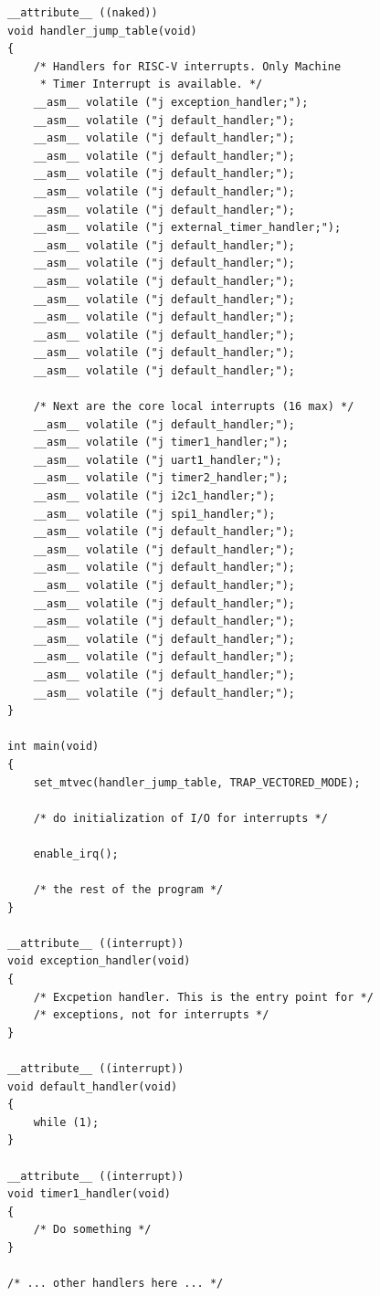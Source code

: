 \documentclass[12pt]{article}
\begin{document}
\begin{lstlisting}[]
__attribute__ ((naked))
void handler_jump_table(void)
{
	/* Handlers for RISC-V interrupts. Only Machine
	 * Timer Interrupt is available. */
	__asm__ volatile ("j exception_handler;");
	__asm__ volatile ("j default_handler;");
	__asm__ volatile ("j default_handler;");
	__asm__ volatile ("j default_handler;");
	__asm__ volatile ("j default_handler;");
	__asm__ volatile ("j default_handler;");
	__asm__ volatile ("j default_handler;");
	__asm__ volatile ("j external_timer_handler;");
	__asm__ volatile ("j default_handler;");
	__asm__ volatile ("j default_handler;");
	__asm__ volatile ("j default_handler;");
	__asm__ volatile ("j default_handler;");
	__asm__ volatile ("j default_handler;");
	__asm__ volatile ("j default_handler;");
	__asm__ volatile ("j default_handler;");
	__asm__ volatile ("j default_handler;");

	/* Next are the core local interrupts (16 max) */
	__asm__ volatile ("j default_handler;");
	__asm__ volatile ("j timer1_handler;");
	__asm__ volatile ("j uart1_handler;");
	__asm__ volatile ("j timer2_handler;");
	__asm__ volatile ("j i2c1_handler;");
	__asm__ volatile ("j spi1_handler;");
	__asm__ volatile ("j default_handler;");
	__asm__ volatile ("j default_handler;");
	__asm__ volatile ("j default_handler;");
	__asm__ volatile ("j default_handler;");
	__asm__ volatile ("j default_handler;");
	__asm__ volatile ("j default_handler;");
	__asm__ volatile ("j default_handler;");
	__asm__ volatile ("j default_handler;");
	__asm__ volatile ("j default_handler;");
	__asm__ volatile ("j default_handler;");
}

int main(void)
{
    set_mtvec(handler_jump_table, TRAP_VECTORED_MODE);

    /* do initialization of I/O for interrupts */

    enable_irq();

    /* the rest of the program */
}

__attribute__ ((interrupt))
void exception_handler(void)
{
    /* Excpetion handler. This is the entry point for */
    /* exceptions, not for interrupts */
}

__attribute__ ((interrupt))
void default_handler(void)
{
    while (1);
}

__attribute__ ((interrupt))
void timer1_handler(void)
{
    /* Do something */
}

/* ... other handlers here ... */
\end{lstlisting}

\end{document}
